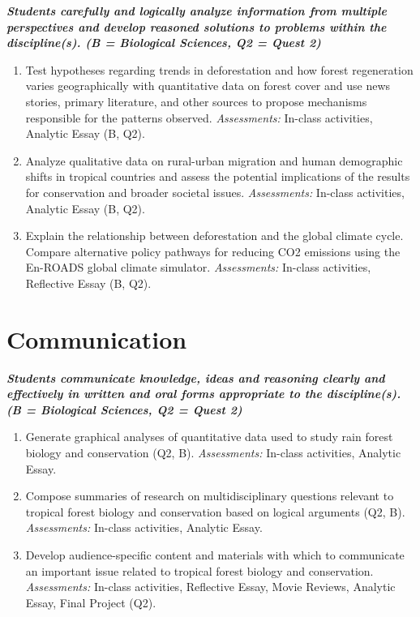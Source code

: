 \documentclass[
  12pt,
  letterpaper,
  DIV=11,
  numbers=noendperiod]{scrreprt}
\begin{document}
\textbf{\emph{Students carefully and logically analyze information from
multiple perspectives and develop reasoned solutions to problems within
the discipline(s). (B = Biological Sciences, Q2 = Quest 2)}}

\begin{enumerate}
\def\labelenumi{(\arabic{enumi})}
\item
  Test hypotheses regarding trends in deforestation and how forest
  regeneration varies geographically with quantitative data on forest
  cover and use news stories, primary literature, and other sources to
  propose mechanisms responsible for the patterns observed.
  \emph{Assessments:} In-class activities, Analytic Essay (B, Q2).
\item
  Analyze qualitative data on rural-urban migration and human
  demographic shifts in tropical countries and assess the potential
  implications of the results for conservation and broader societal
  issues. \emph{Assessments:} In-class activities, Analytic Essay (B,
  Q2).
\item
  Explain the relationship between deforestation and the global climate
  cycle. Compare alternative policy pathways for reducing CO2 emissions
  using the En-ROADS global climate simulator. \emph{Assessments:}
  In-class activities, Reflective Essay (B, Q2).
\end{enumerate}

\section*{Communication}\label{communication}

\textbf{\emph{Students communicate knowledge, ideas and reasoning
clearly and effectively in written and oral forms appropriate to the
discipline(s). (B = Biological Sciences, Q2 = Quest 2)}}

\begin{enumerate}
\def\labelenumi{(\arabic{enumi})}
\item
  Generate graphical analyses of quantitative data used to study rain
  forest biology and conservation (Q2, B). \emph{Assessments:} In-class
  activities, Analytic Essay.
\item
  Compose summaries of research on multidisciplinary questions relevant
  to tropical forest biology and conservation based on logical arguments
  (Q2, B). \emph{Assessments:} In-class activities, Analytic Essay.
\item
  Develop audience-specific content and materials with which to
  communicate an important issue related to tropical forest biology and
  conservation. \emph{Assessments:} In-class activities, Reflective
  Essay, Movie Reviews, Analytic Essay, Final Project (Q2).
\end{enumerate}
\end{document}
